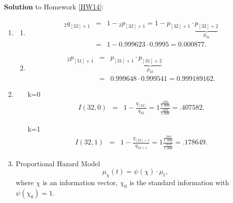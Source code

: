 \documentclass[11pt,fleqn,oneside]{book}
\begin{document}
\noindent \textbf{Solution} to Homework \ref{HW14}:
\footnotesize
\begin{enumerate}
\item
\begin{enumerate}
\item 
\begin{eqnarray*}
{_2q_{[32]+1}} &=& 1 - {_2p_{[32]+1}} = 1- {p_{[32]+1}}\cdot \underbrace{{p_{[32]+2}}}_{p_{34}}\\
&=& 1 - 0.999623 \cdot 0.9995 = 0.000877.
\end{eqnarray*}
\item
\begin{eqnarray*}
{_2p_{[31]+1}} &=& {p_{[31]+1}}\cdot \underbrace{{p_{[31]+2}}}_{p_{33}}\\
&=& 0.999648\cdot 0.999541 = 0.999189162. 
\end{eqnarray*}
\end{enumerate}

\item
\begin{itemize}
\item[k=0]
\begin{eqnarray*}
I(32,0) &=& 1 - \frac{q_{[32]}}{q_{32}}
= 1 \frac{\frac{.250}{1,000}}{\frac{.422}{1,000}} = .407582.
\end{eqnarray*}
\item[k=1]
\begin{eqnarray*}
I(32,1) &=& 1 - \frac{q_{[32]+1}}{q_{32+1}}
= 1 \frac{\frac{.377}{1,000}}{\frac{.459}{1,000}} = .178649.
\end{eqnarray*}
\end{itemize}

\item Proportional Hazard Model
$$
\mu_\chi(t) = \psi(\chi)\cdot \mu_t,
$$
where $\chi$ is an information vector, $\chi_0$ is the standard information with $\psi(\chi_0)=1$.


\end{enumerate}
\end{document}
